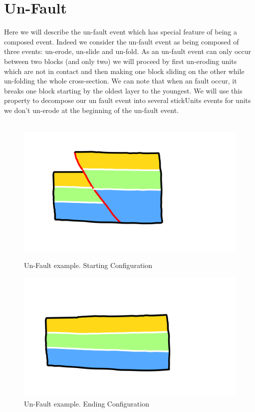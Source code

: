 \documentclass[12pt, a4paper]{memoir} %
\begin{document}
\section{Un-Fault}

Here we will describe the un-fault event which has special feature of being a composed event. Indeed we consider the un-fault event as being composed of three events: un-erode, un-slide and un-fold. As an un-fault event can only occur between two blocks (and only two) we will proceed by first un-eroding units which are not in contact and then making one block sliding on the other while un-folding the whole cross-section. We can note that when an fault occur, it breaks one block starting by the oldest layer to the youngest. We will use this property to decompose our un fault event into several stickUnits events for units we don't un-erode at the beginning of the un-fault event.\\\\
\begin{figure}[h]
    \begin{minipage}[c]{.46\linewidth}
        \centering
        \includegraphics[scale=0.2]{unFaultDescription0.png}
	\caption{Un-Fault example. Starting Configuration}
    \end{minipage}
    \hfill%
    \begin{minipage}[c]{.46\linewidth}
        \centering
        \includegraphics[scale=0.2]{unFaultDescription1.png}
	\caption{Un-Fault example. Ending Configuration}
    \end{minipage}
\end{figure}
\end{document}
